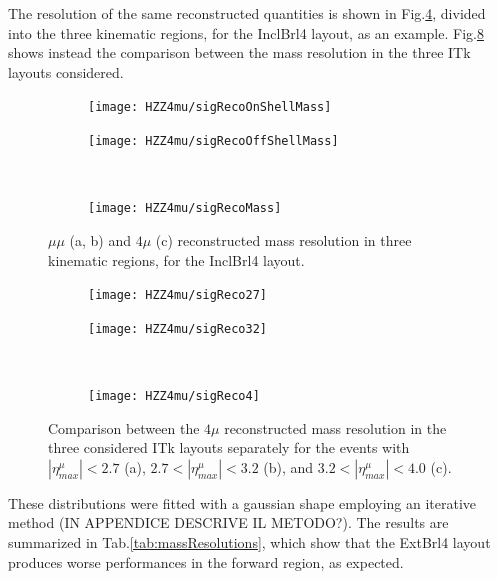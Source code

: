 \documentclass[a4paper,twoside,12pt]{article}
\begin{document}
 The resolution of the same reconstructed quantities is shown in Fig.\ref{fig:HZZ4mu:massResolution}, divided into the three kinematic regions, for the InclBrl4 layout, as an example. Fig.\ref{fig:HZZ4mu:layoutMassResolution} shows instead the comparison between the mass resolution in the three ITk layouts considered.\\

\begin{figure}
\begin{subfigure}{.5\linewidth}
\texttt{[image: HZZ4mu/sigRecoOnShellMass]}
\caption{}
\label{fig:HZZ4mu:sigRecoOnShellMass}
\end{subfigure}
\begin{subfigure}{.5\linewidth}
\centering
\texttt{[image: HZZ4mu/sigRecoOffShellMass]}
\caption{}
\label{fig:HZZ4mu:sigRecoOffShell}
\end{subfigure}\\[1ex]
\begin{subfigure}{\linewidth}
\centering
\texttt{[image: HZZ4mu/sigRecoMass]}
\caption{}
\label{fig:HZZ4mu:sigRecoMass}
\end{subfigure}
\caption{$\mu\mu$ (a, b) and $4\mu$ (c) reconstructed  mass resolution in three kinematic regions, 
		for the InclBrl4 layout.}
\label{fig:HZZ4mu:massResolution}
\end{figure}

\begin{figure}
\begin{subfigure}{.5\linewidth}
\texttt{[image: HZZ4mu/sigReco27]}
\caption{}
\label{fig:HZZ4mu:sigReco27}
\end{subfigure}
\begin{subfigure}{.5\linewidth}
\centering
\texttt{[image: HZZ4mu/sigReco32]}
\caption{}
\label{fig:HZZ4mu:sigReco32}
\end{subfigure}\\[1ex]
\begin{subfigure}{\linewidth}
\centering
\texttt{[image: HZZ4mu/sigReco4]}
\caption{}
\label{fig:HZZ4mu:sigReco4}
\end{subfigure}
\caption{Comparison between the $4\mu$ reconstructed mass resolution in the
three considered ITk layouts separately for the events with $|\eta^\mu_{max}| < 2.7$ (a),
	$2.7 < |\eta^\mu_{max}| < 3.2$ (b), and $3.2 < |\eta^\mu_{max}| < 4.0$ (c).}
\label{fig:HZZ4mu:layoutMassResolution}
\end{figure}

These distributions were fitted with a gaussian shape employing an iterative method 
(IN APPENDICE DESCRIVE IL METODO?). The results are summarized in 
Tab.\ref{tab:massResolutions}, which show that the ExtBrl4 layout produces worse performances in the forward region, as
expected. \\
\end{document}
